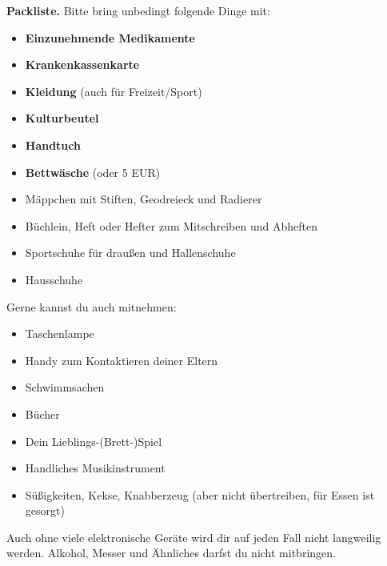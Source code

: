 \documentclass[12pt]{zettel}
\begin{document}
\begin{shaded}
\textbf{Packliste.} Bitte bring unbedingt folgende Dinge mit:
\begin{itemize}
\item \textbf{Einzunehmende Medikamente}
\item \textbf{Krankenkassenkarte}
\item \textbf{Kleidung} (auch für Freizeit/Sport)
\item \textbf{Kulturbeutel}
\item \textbf{Handtuch}
\item \textbf{Bettwäsche} (oder 5 EUR)
\item Mäppchen mit Stiften, Geodreieck und Radierer %
\item Büchlein, Heft oder Hefter zum Mitschreiben und Abheften
\item Sportschuhe für draußen und Hallenschuhe
\item Hausschuhe
\end{itemize}
Gerne kannst du auch mitnehmen:
\begin{itemize}
\item Taschenlampe
\item Handy zum Kontaktieren deiner Eltern
\item Schwimmsachen
\item Bücher
\item Dein Lieblings-(Brett-)Spiel
\item Handliches Musikinstrument
\item Süßigkeiten, Kekse, Knabberzeug (aber nicht übertreiben, für Essen
ist gesorgt)
\end{itemize}
Auch ohne viele elektronische Geräte wird dir auf jeden Fall nicht langweilig werden.
Alkohol, Messer und Ähnliches darfst du nicht mitbringen. 

\end{shaded}

\vfill
\end{document}
